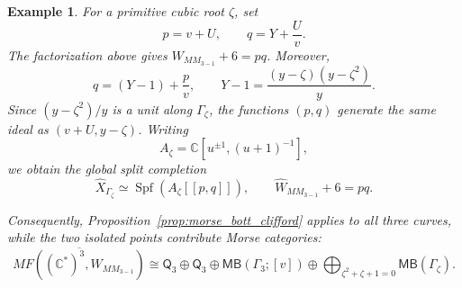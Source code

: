 \documentclass[11pt]{amsart}
\newtheorem{example}{Example}[section]
\newcommand{\MorseCat}[1]{\mathsf{Q}_{#1}}
\newcommand{\MBcat}[1]{\mathsf{MB}(#1)}
\newcommand{\MBtwcat}[2]{\mathsf{MB}(#1;[#2])}
\begin{document}
\begin{example}
For a primitive cubic root $\zeta$, set
\[
p=v+U,
\qquad
q=Y+\frac{U}{v}.
\]
The factorization above gives $W_{MM_{3-1}}+6=pq$. Moreover,
\[
q=(Y-1)+\frac{p}{v},
\qquad
Y-1=\frac{(y-\zeta)(y-\zeta^2)}{y}.
\]
Since $(y-\zeta^2)/y$ is a unit along $\Gamma_\zeta$, the functions $(p,q)$
generate the same ideal as $(v+U,y-\zeta)$. Writing
\[
A_\zeta=\mathbb C[u^{\pm1},(u+1)^{-1}],
\]
we obtain the global split completion
\[
\widehat X_{\Gamma_\zeta}
\simeq
\operatorname{Spf}\!\left(A_\zeta[[p,q]]\right),
\qquad
\widehat W_{MM_{3-1}}+6=pq.
\]

Consequently, Proposition~\ref{prop:morse_bott_clifford} applies to all three
curves, while the two isolated points contribute Morse categories:
\[
\overline{MF((\mathbb{C}^*)^3,W_{MM_{3-1}})}
\cong \MorseCat{3}\oplus \MorseCat{3}
\oplus \MBtwcat{\Gamma_3}{v}
\oplus\bigoplus_{\zeta^2+\zeta+1=0}\MBcat{\Gamma_\zeta}.
\]
\end{example}
\end{document}
